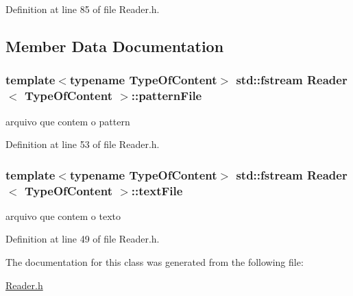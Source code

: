 Definition at line 85 of file Reader.\+h.



\subsection{Member Data Documentation}
\hypertarget{classReader_ab38c2e4b4e9e31982fd77158fb88eeec}{
\subsubsection[{pattern\+File}]{\setlength{\rightskip}{0pt plus 5cm}template$<$typename Type\+Of\+Content$>$ std\+::fstream {\bf Reader}$<$ Type\+Of\+Content $>$\+::pattern\+File}}\label{classReader_ab38c2e4b4e9e31982fd77158fb88eeec}


arquivo que contem o pattern 



Definition at line 53 of file Reader.\+h.

\hypertarget{classReader_ab1b8cba2b947b66777f32cbf7743ba7e}{
\subsubsection[{text\+File}]{\setlength{\rightskip}{0pt plus 5cm}template$<$typename Type\+Of\+Content$>$ std\+::fstream {\bf Reader}$<$ Type\+Of\+Content $>$\+::text\+File}}\label{classReader_ab1b8cba2b947b66777f32cbf7743ba7e}


arquivo que contem o texto 



Definition at line 49 of file Reader.\+h.



The documentation for this class was generated from the following file\+:\begin{DoxyCompactItemize}
\item 
\hyperlink{Reader_8h}{Reader.\+h}\end{DoxyCompactItemize}
